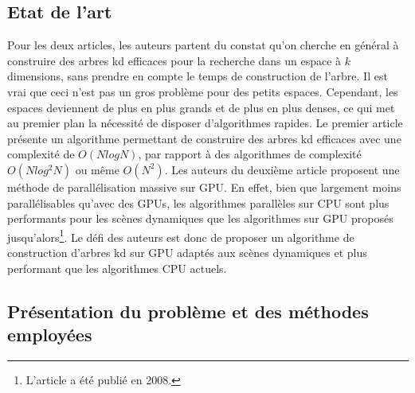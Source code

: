\documentclass[a4paper]{article}
\begin{document}
\subsection{Etat de l'art}
Pour les deux articles, les auteurs partent du constat qu'on cherche en général à construire des arbres kd efficaces pour la recherche dans un espace à $k$ dimensions, sans prendre en compte le temps de construction de l'arbre. Il est vrai que ceci n'est pas un gros problème pour des petits espaces. Cependant, les espaces deviennent de plus en plus grands et de plus en plus denses, ce qui met au premier plan la nécessité de disposer d'algorithmes rapides.
Le premier article présente un algorithme permettant de construire des arbres kd efficaces avec une complexité de $O(NlogN)$, par rapport à des algorithmes de complexité $O(Nlog^2N)$ ou même $O(N^2)$. Les auteurs du deuxième article proposent une méthode de parallélisation massive sur GPU. En effet, bien que largement moins parallélisables qu'avec des GPUs, les algorithmes parallèles sur CPU sont plus performants pour les scènes dynamiques que les algorithmes sur GPU proposés jusqu'alors\footnote{L'article a été publié en 2008.}. Le défi des auteurs est donc de proposer un algorithme de construction d'arbres kd sur GPU adaptés aux scènes dynamiques et plus performant que les algorithmes CPU actuels.

\subsection{Présentation du problème et des méthodes employées}
\end{document}
